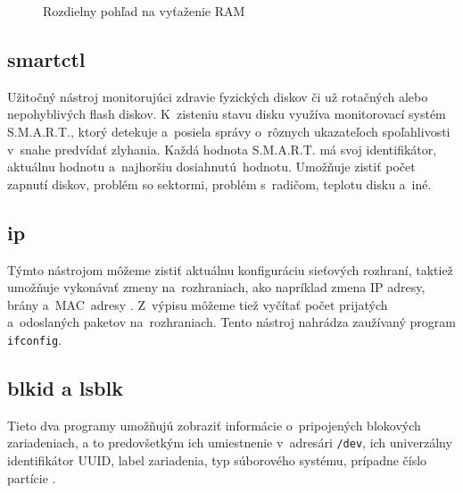 \begin{figure}[H]
	\begin{center}
		\caption{Rozdielny pohľad na vyťaženie RAM \cite{smem}}
		\label{smem_pss}
	\end{center}
\end{figure}

\subsection*{smartctl}
Užitočný nástroj monitorujúci zdravie fyzických diskov či už rotačných alebo nepohyblivých flash diskov. K~zisteniu stavu disku využíva monitorovací systém S.M.A.R.T., ktorý detekuje a~posiela správy o~rôznych ukazateľoch spoľahlivosti v~snahe predvídať zlyhania. Každá hodnota S.M.A.R.T. má svoj identifikátor, aktuálnu hodnotu a~najhoršiu \mbox{dosiahnutú hodnotu}. Umožňuje zistiť počet zapnutí diskov, problém so sektormi, problém s~radičom, teplotu disku a~iné. \cite{performance-monitor-book} 

\subsection*{ip}
Týmto nástrojom môžeme zistiť aktuálnu konfiguráciu sieťových rozhraní, taktiež umožňuje vykonávať zmeny na~rozhraniach, ako napríklad zmena IP adresy, brány \mbox{a~MAC adresy} \cite{text-utils-book}. Z~výpisu môžeme tiež vyčítať počet prijatých a~odoslaných paketov na~rozhraniach. Tento nástroj nahrádza zaužívaný program \texttt{ifconfig}.

\subsection*{blkid a lsblk}
Tieto dva programy umožňujú zobraziť informácie o~pripojených blokových zariadeniach, a to predovšetkým ich umiestnenie v~adresári \texttt{/dev}, ich univerzálny identifikátor UUID, label zariadenia, typ súborového systému, prípadne číslo partície \cite{text-utils-book}.

